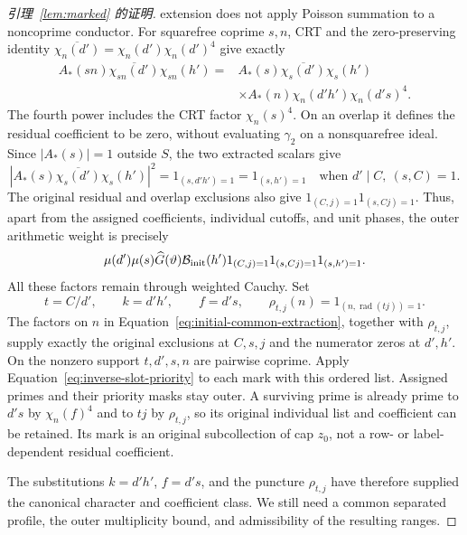 \documentclass[11pt,a4paper]{article}
\numberwithin{equation}{section}
\numberwithin{figure}{section}
\theoremstyle{definition}
\theoremstyle{remark}
\begin{document}
\begin{proof}[引理~\ref{lem:marked} 的证明]
extension does not apply Poisson summation to a noncoprime conductor.
For squarefree coprime \(s,n\), CRT and the zero-preserving identity
\(\overline{\chi_n(d')}=\chi_n(d')\chi_n(d')^4\) give exactly
\begin{equation}\label{eq:initial-common-extraction}
 \begin{split}
 A_*(sn)\overline{\chi_{sn}(d')}\chi_{sn}(h')
 ={}&A_*(s)\overline{\chi_s(d')}\chi_s(h')\\
 &\times A_*(n)\chi_n(d'h')\chi_n(d's)^4.
 \end{split}
\end{equation}
The fourth power includes the CRT factor \(\chi_n(s)^4\).
On an overlap it defines the residual coefficient to be zero, without
evaluating \(\gamma_2\) on a nonsquarefree ideal.  Since \(|A_*(s)|=1\)
outside \(S\), the two extracted scalars give
\[
 |A_*(s)\overline{\chi_s(d')}\chi_s(h')|^2
 =1_{(s,d'h')=1}=1_{(s,h')=1}
 \quad\text{when }d'\mid C,\ (s,C)=1.
\]
The original residual and overlap exclusions also give
\(1_{(C,j)=1}1_{(s,Cj)=1}\).  Thus, apart from the assigned
coefficients, individual cutoffs, and unit phases, the outer arithmetic
weight is precisely
\begin{equation}\label{eq:initial-outer-arithmetic}
 \mu(d')\mu(s)\widehat G(\vartheta)\mathcal B_{\rm init}(h')
 1_{(C,j)=1}1_{(s,Cj)=1}1_{(s,h')=1}.
\end{equation}
All these factors remain through weighted Cauchy.  Set
\[
 t=C/d',\qquad k=d'h',\qquad f=d's,\qquad
 \rho_{t,j}(n)=1_{(n,\operatorname{rad}(tj))=1}.
\]
The factors on \(n\) in Equation~\eqref{eq:initial-common-extraction},
together with \(\rho_{t,j}\), supply exactly the original exclusions
at \(C,s,j\) and the numerator zeros at \(d',h'\).  On the nonzero
support \(t,d',s,n\) are pairwise coprime.  Apply
Equation~\eqref{eq:inverse-slot-priority} to each mark with this
ordered list.  Assigned primes and their priority masks stay outer.
A surviving prime is already prime to \(d's\) by \(\chi_n(f)^4\)
and to \(tj\) by \(\rho_{t,j}\), so its original individual list and
coefficient can be retained.  Its mark is an original subcollection
of cap \(z_0\), not a row- or label-dependent residual coefficient.

The substitutions \(k=d'h'\), \(f=d's\), and the puncture
\(\rho_{t,j}\) have therefore supplied the canonical character and
coefficient class.  We still need a common separated profile, the
outer multiplicity bound, and admissibility of the resulting ranges.


\end{proof}
\end{document}
